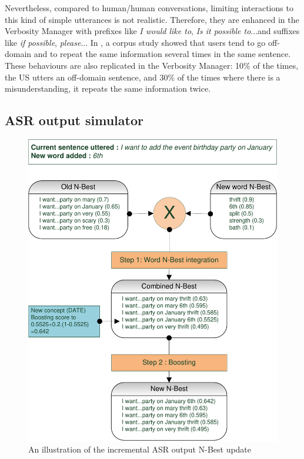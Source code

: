			Nevertheless, compared to human/human conversations, limiting interactions to this kind of simple utterances is not realistic. Therefore, they are enhanced in the Verbosity Manager with prefixes like \textit{I would like to}, \textit{Is it possible to}...and suffixes like \textit{if possible}, \textit{please}... In \cite{Ghigi2014}, a corpus study showed that users tend to go off-domain and to repeat the same information several times in the same sentence. These behaviours are also replicated in the Verbosity Manager: 10\% of the times, the US utters an off-domain sentence, and 30\% of the times where there is a misunderstanding, it repeats the same information twice.
		
    \subsection{ASR output simulator}
    \label{subsec:asroutputsimu}
		
			\begin{figure}[hb]
          \centering
          \includegraphics[scale=0.8]{figures/ASRSimu.pdf}
          \caption{An illustration of the incremental ASR output N-Best update}
          \label{fig:asrsimu}
        \end{figure}
    
